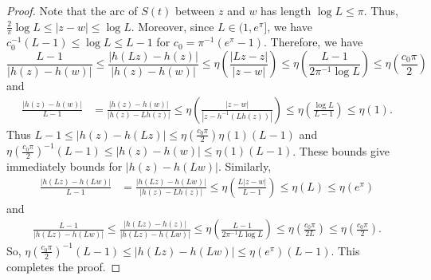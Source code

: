 \documentclass[10pt,a4paper]{amsart}
\begin{document}
\begin{proof}
Note that the arc of $S(t)$ between $z$ and $w$ has length $\log L\leq \pi$. Thus, $ \frac{2}{\pi}\log L \leq |z-w|\leq \log L$. Moreover, since $L\in (1,e^{\pi}]$, we have $c_0^{-1}(L-1)\leq \log L \leq L-1$ for $c_0=\pi^{-1}(e^\pi-1)$. Therefore, we have
$$\frac{L-1}{|h(z)-h(w)|}\leq \frac{|h(Lz)-h(z)|}{|h(z)-h(w)|}\leq \eta\left( \frac{|Lz-z|}{|z-w|}\right) \leq \eta\left(\frac{L-1}{2\pi^{-1}\log L}\right)\leq \eta\left(\frac{c_0\pi}{2}\right) $$ 
and
\begin{align*}
\frac{|h(z)-h(w)|}{L-1}&=\frac{|h(z)-h(w)|}{|h(z)- Lh(z)|}\leq \eta\left( \frac{|z-w|}{|z- h^{-1}(Lh(z))|}\right)\leq \eta \left(\frac{\log L}{L-1}\right)\leq \eta(1). 
\end{align*}
Thus $L-1\leq |h(z)-h(Lz)|\leq \eta(\frac{c_0\pi}{2})\eta(1)(L-1)$ and $\eta(\frac{c_0\pi}{2})^{-1}(L-1)\leq  |h(z)-h(w)|\leq \eta(1)(L-1)$.  These bounds give immediately bounds for $|h(z)-h(Lw)|$.  Similarly, 
\begin{align*}
\frac{|h(Lz)-h(Lw)|}{L-1}& = \frac{|h(Lz)-h(Lw)|}{|h(z)-Lh(z)|} \leq \eta \left(\frac{L|z-w|}{L-1}\right)\leq \eta(L)\leq \eta(e^\pi)
\end{align*}
and
\begin{align*}
\frac{L-1}{|h(Lz)-h(Lw)|}\leq \frac{|h(Lz)-h(z)|}{|h(Lz)-h(Lw)|} \leq \eta\left(\frac{L-1}{2\pi^{-1}L\log L}\right)\leq \eta\left(\frac{c_0\pi}{2L}\right)\leq \eta\left(\frac{c_0\pi}{2}\right).
\end{align*}
So, $\eta(\frac{c_0\pi}{2})^{-1}(L-1)\leq |h(Lz)-h(Lw)|\leq \eta(e^\pi)(L-1)$. This completes the proof.
\end{proof}
\end{document}
